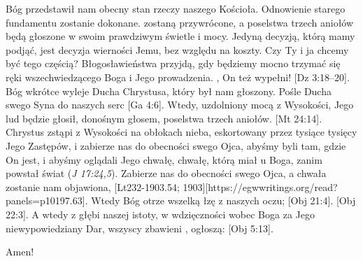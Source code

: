 Bóg przedstawił nam obecny stan rzeczy naszego Kościoła. Odnowienie starego fundamentu zostanie dokonane.  zostaną przywrócone, a poselstwa trzech aniołów będą głoszone w swoim prawdziwym świetle i mocy. Jedyną decyzją, którą mamy podjąć, jest decyzja wierności Jemu, bez względu na koszty. Czy Ty i ja chcemy być tego częścią? Błogosławieństwa przyjdą, gdy będziemy mocno trzymać się ręki wszechwiedzącego Boga i Jego prowadzenia. , On też wypełni! [Dz 3:18--20]. Bóg wkrótce wyleje Ducha Chrystusa, który był nam głoszony. Pośle Ducha swego Syna do naszych serc [Ga 4:6]. Wtedy, uzdolniony mocą z Wysokości, Jego lud będzie głosił, donośnym głosem, poselstwa trzech aniołów. [Mt 24:14]. Chrystus zstąpi z Wysokości na obłokach nieba, eskortowany przez tysiące tysięcy Jego Zastępów, i zabierze nas do obecności swego Ojca, abyśmy byli tam, gdzie On jest, i abyśmy oglądali Jego chwałę, chwałę, którą miał u Boga, zanim powstał świat (\textit{J 17:24,5}). Zabierze nas do obecności swego Ojca, a chwała zostanie nam objawiona, [Lt232-1903.54; 1903][https://egwwritings.org/read?panels=p10197.63]. Wtedy Bóg otrze wszelką łzę z naszych oczu; [Obj 21:4]. [Obj 22:3]. A wtedy z głębi naszej istoty, w wdzięczności wobec Boga za Jego niewypowiedziany Dar, wszyscy zbawieni , ogłoszą: [Obj 5:13].

Amen!

